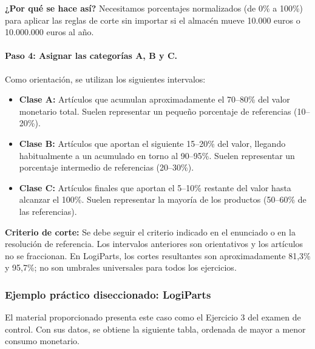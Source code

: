 \documentclass[11pt,a4paper]{article}
\begin{document}
\textbf{¿Por qué se hace así?} Necesitamos porcentajes normalizados (de 0\% a 100\%) para aplicar las reglas de corte sin importar si el almacén mueve 10.000 euros o 10.000.000 euros al año.

\paragraph{Paso 4: Asignar las categorías A, B y C.}
Como orientación, se utilizan los siguientes intervalos:
\begin{itemize}
    \item \textbf{Clase A:} Artículos que acumulan aproximadamente el 70--80\% del valor monetario total. Suelen representar un pequeño porcentaje de referencias (10--20\%).
    \item \textbf{Clase B:} Artículos que aportan el siguiente 15--20\% del valor, llegando habitualmente a un acumulado en torno al 90--95\%. Suelen representar un porcentaje intermedio de referencias (20--30\%).
    \item \textbf{Clase C:} Artículos finales que aportan el 5--10\% restante del valor hasta alcanzar el 100\%. Suelen representar la mayoría de los productos (50--60\% de las referencias).
\end{itemize}
\textbf{Criterio de corte:} Se debe seguir el criterio indicado en el enunciado o en la resolución de referencia. Los intervalos anteriores son orientativos y los artículos no se fraccionan. En LogiParts, los cortes resultantes son aproximadamente 81,3\% y 95,7\%; no son umbrales universales para todos los ejercicios.

\subsubsection{Ejemplo práctico diseccionado: LogiParts}
El material proporcionado presenta este caso como el Ejercicio 3 del examen de control. Con sus datos, se obtiene la siguiente tabla, ordenada de mayor a menor consumo monetario.
\end{document}
